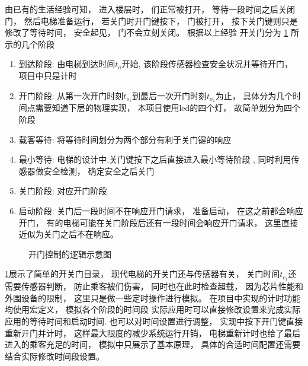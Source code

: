 \documentclass[../main.tex]{subfiles} %
\begin{document}
由已有的生活经验可知，
进入楼层时，
们正常被打开，
等待一段时间之后关闭门，
然后电梯准备运行，
若关门时开门键按下，
门被打开，
按下关门键则只是修改了等待时间，
安全起见，
门不会立刻关闭。
根据以上经验
开关门分为%
\cref{fig:door_control}
所示的几个阶段
\begin{enumerate}
  \item 到达阶段:
    由电梯到达时间$t_a$开始,
    该阶段传感器检查安全状况并等待开门，
    项目中只是计时
  \item 开门阶段:
    从第一次开门时刻$t_{o_1}$到最后一次开门时刻$t_{o_4}$为止，
    具体分为几个时间点需要知道下层的物理实现，
    本项目使用led的四个灯，
    故简单划分为四个阶段
  \item 载客等待:
    将等待时间划分为两个部分有利于关门键的响应
  \item 最小等待:
    电梯的设计中,关门键按下之后直接进入最小等待阶段
    ,
    同时利用传感器做安全检测，
    确定安全之后关门
  \item 关门阶段:
    对应开门阶段
  \item 启动阶段:
    关门后一段时间不在响应开门请求，
    准备启动，
    在这之前都会响应开门，
    有的电梯可能在关门阶段后还有一段时间会响应开门请求，
    这里直接近似为关门之后不在响应。
\end{enumerate}

\begin{figure}[H]
  \centering
  \def\svgwidth{\linewidth}
  
  \caption{开门控制的逻辑示意图}
  \label{fig:door_control}
\end{figure}

\cref{fig:door_control}展示了简单的开关门目录，
现代电梯的开关门还与传感器有关，
关门时间$t_{c_1}$还需要传感器判断，
防止乘客被们伤害，
同时也在此时检查超载，
因为芯片性能和外围设备的限制，
这里只是做一些定时操作进行模拟。
在项目中实现的计时功能均使用宏定义，
模拟各个阶段的时间段
实际应用时可以直接修改设置来完成实际应用的等待时间和启动时间.
也可以对时间设置进行调整，
实现中按下开门键直接重新开门并计时，
这样最大限度的减少系统运行开销，
电梯重新计时也给了最后进入的乘客充足的时间，
模拟中只展示了基本原理，
具体的合适时间配置还需要结合实际修改时间段设置。
\end{document}
